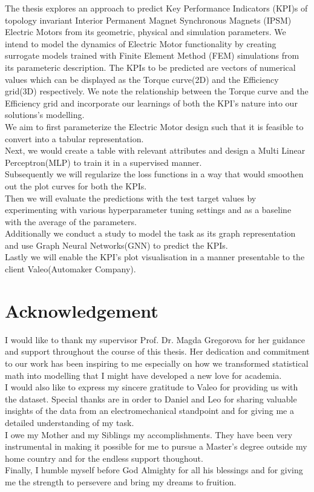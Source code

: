 \documentclass{report} %
\begin{document}
The thesis explores an approach to predict Key Performance Indicators (KPI)s of topology invariant Interior Permanent Magnet Synchronous Magnets 
(IPSM) Electric Motors from its geometric, physical and simulation parameters.
We intend to model the dynamics of Electric Motor functionality by creating surrogate models trained with Finite Element Method (FEM) 
simulations from its parameteric description.
The KPIs to be predicted are vectors of numerical values which can be displayed as the Torque curve(2D) and the Efficiency grid(3D) respectively.
We note the relationship between the Torque curve and the Efficiency grid and incorporate our learnings of both the KPI's nature into our solutions's modelling. \\
We aim to first parameterize the Electric Motor design such that it is feasible to convert into a tabular representation. \\
Next, we would create a table with relevant attributes and design a Multi Linear Perceptron(MLP) to train it in a supervised manner.\\
Subsequently we will regularize the loss functions in a way that would smoothen out the plot curves for both the KPIs. \\
Then we will evaluate the predictions with the test target values by experimenting with various hyperparameter tuning settings 
and as a baseline with the average of the parameters.\\
Additionally we conduct a study to model the task as its graph representation and use Graph Neural Networks(GNN) to predict the KPIs.\\
Lastly we will enable the KPI's plot visualisation in a manner presentable to the client Valeo(Automaker Company).\\

\newpage 

\newpage 

\chapter*{Acknowledgement}
I would like to thank my supervisor Prof. Dr. Magda Gregorova for her guidance and support throughout the course of this thesis.
Her dedication and commitment to our work has been inspiring to me especially on how we transformed statistical math into modelling that I might have developed a new love for academia. \\
I would also like to express my sincere gratitude to Valeo for providing us with the dataset.
Special thanks are in order to Daniel and Leo for sharing valuable insights of the data from an electromechanical standpoint and for giving me a detailed understanding of my task. \\
I owe my Mother and my Siblings my accomplishments. They have been very instrumental in making it possible for me to pursue a Master's degree outside my home country and for the endless support thoughout.\\
Finally, I humble myself before God Almighty for all his blessings and for giving me the strength to persevere and bring my dreams to fruition.\\
\end{document}
